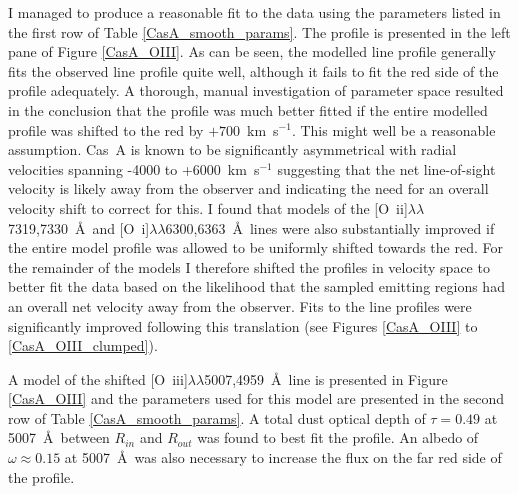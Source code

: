 I managed to produce a reasonable fit to the data using the parameters listed in the first row of Table \ref{CasA_smooth_params}.  The profile is presented in the left pane of Figure \ref{CasA_OIII}.  As can be seen,  the modelled line profile generally fits the observed line profile quite well, although it fails to fit the red side of the profile adequately.  A thorough, manual investigation of parameter space resulted in the conclusion that the profile was much better fitted if the entire modelled profile was shifted to the red by $+700$~km~s$^{-1}$.  This might well be a reasonable assumption.  Cas~A is known to be significantly asymmetrical \citep{Rest2011} with radial velocities spanning -4000 to +6000~km~s$^{-1}$ \citep{Milisavljevic2013} suggesting that the net line-of-sight velocity is likely away from the observer and indicating the need for an overall velocity shift to correct for this.  I found that models of the  [O~{\sc ii}]$\lambda\lambda$7319,7330~\AA\ and [O~{\sc i}]$\lambda\lambda$6300,6363~\AA\  lines were also substantially improved if the entire model profile was allowed to be uniformly shifted towards the red.  For the remainder of the models I therefore shifted the profiles in velocity space to better fit the data based on the likelihood that the sampled emitting regions had an overall net velocity away from the observer.  Fits to the line profiles were significantly improved following this translation (see Figures \ref{CasA_OIII} to \ref{CasA_OIII_clumped}).



A model of the shifted [O~{\sc iii}]$\lambda\lambda$5007,4959~\AA\  line is presented in Figure \ref{CasA_OIII} and the parameters used for this model are presented in the second row of Table \ref{CasA_smooth_params}.  A total dust optical depth of $\tau=0.49$ at 5007~\AA\  between $R_{in}$ and $R_{out}$ was found to best fit the profile.  An albedo of $\omega\approx0.15$ at 5007~\AA\  was also necessary to increase the flux on the far red side of the profile.

